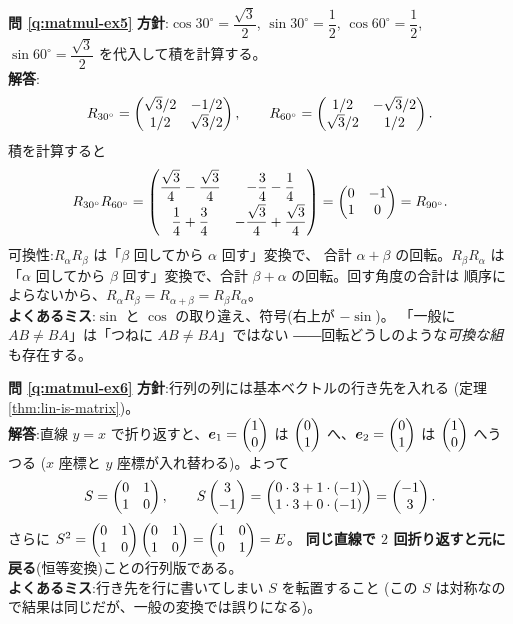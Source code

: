\bigskip
\noindent\textbf{問 \ref{q:matmul-ex5}}\quad
\textbf{方針}:$\cos 30^\circ = \dfrac{\sqrt{3}}{2}$,
$\sin 30^\circ = \dfrac{1}{2}$, $\cos 60^\circ = \dfrac{1}{2}$,
$\sin 60^\circ = \dfrac{\sqrt{3}}{2}$ を代入して積を計算する。\\
\textbf{解答}:
\[
R_{30^\circ} = \begin{pmatrix}\sqrt{3}/2 & -1/2 \\ 1/2 & \sqrt{3}/2\end{pmatrix}, \qquad
R_{60^\circ} = \begin{pmatrix}1/2 & -\sqrt{3}/2 \\ \sqrt{3}/2 & 1/2\end{pmatrix}.
\]
積を計算すると
\[
R_{30^\circ} R_{60^\circ}
= \begin{pmatrix}\dfrac{\sqrt{3}}{4} - \dfrac{\sqrt{3}}{4} & -\dfrac{3}{4} - \dfrac{1}{4} \\[2mm]
\dfrac{1}{4} + \dfrac{3}{4} & -\dfrac{\sqrt{3}}{4} + \dfrac{\sqrt{3}}{4}\end{pmatrix}
= \begin{pmatrix}0 & -1 \\ 1 & 0\end{pmatrix} = R_{90^\circ}.
\]
可換性:$R_\alpha R_\beta$ は「$\beta$ 回してから $\alpha$ 回す」変換で、
合計 $\alpha + \beta$ の回転。$R_\beta R_\alpha$ は「$\alpha$ 回してから
$\beta$ 回す」変換で、合計 $\beta + \alpha$ の回転。回す角度の合計は
順序によらないから、$R_\alpha R_\beta = R_{\alpha + \beta} = R_\beta R_\alpha$。\\
\textbf{よくあるミス}:$\sin$ と $\cos$ の取り違え、符号(右上が $-\sin$)。
「一般に $AB \neq BA$」は「つねに $AB \neq BA$」ではない
――回転どうしのような\emph{可換な組}も存在する。

\bigskip
\noindent\textbf{問 \ref{q:matmul-ex6}}\quad
\textbf{方針}:行列の列には基本ベクトルの行き先を入れる
(定理 \ref{thm:lin-is-matrix})。\\
\textbf{解答}:直線 $y = x$ で折り返すと、$\bm{e}_1 = \begin{pmatrix}1 \\ 0\end{pmatrix}$ は
$\begin{pmatrix}0 \\ 1\end{pmatrix}$ へ、$\bm{e}_2 = \begin{pmatrix}0 \\ 1\end{pmatrix}$ は $\begin{pmatrix}1 \\ 0\end{pmatrix}$ へうつる
($x$ 座標と $y$ 座標が入れ替わる)。よって
\[
S = \begin{pmatrix}0 & 1 \\ 1 & 0\end{pmatrix}, \qquad
S\begin{pmatrix}3 \\ -1\end{pmatrix} = \begin{pmatrix}0 \cdot 3 + 1 \cdot (-1) \\ 1 \cdot 3 + 0 \cdot (-1)\end{pmatrix}
= \begin{pmatrix}-1 \\ 3\end{pmatrix}.
\]
さらに
$S^2 = \begin{pmatrix}0 & 1 \\ 1 & 0\end{pmatrix}\begin{pmatrix}0 & 1 \\ 1 & 0\end{pmatrix} = \begin{pmatrix}1 & 0 \\ 0 & 1\end{pmatrix} = E$。
\textbf{同じ直線で $2$ 回折り返すと元に戻る}(恒等変換)ことの行列版である。\\
\textbf{よくあるミス}:行き先を行に書いてしまい $S$ を転置すること
(この $S$ は対称なので結果は同じだが、一般の変換では誤りになる)。

